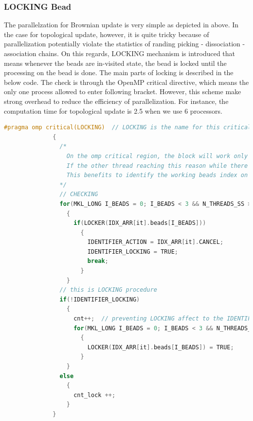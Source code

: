 \documentclass[10pt, a4paper]{article}
\begin{document}
\begin{appendices}
  \subsubsection{LOCKING Bead}
  The parallelzation for Brownian update is very simple as depicted in above. In the case for topological update, however, it is quite tricky because of parallelization potentially violate the statistics of randing picking - dissociation - association chains. On this regards, LOCKING mechanism is introduced that means whenever the beads are in-visited state, the bead is locked until the processing on the bead is done. The main parts of locking is described in the below code. The check is through the OpenMP critical directive, which means the only one process allowed to enter following bracket. However, this scheme make strong overhead to reduce the efficiency of parallelization. For instance, the computation time for topological update is 2.5 when we use 6 processors. 

  \begin{lstlisting}[language=C++,frame=single]
#pragma omp critical(LOCKING)  // LOCKING is the name for this critical blocks
              {
                /*
                  On the omp critical region, the block will work only one thread.
                  If the other thread reaching this reason while there is one thread already working on this block, then the reached thread will wait until finishing the job of the other thread.
                  This benefits to identify the working beads index on this case, since the 
                */
                // CHECKING
                for(MKL_LONG I_BEADS = 0; I_BEADS < 3 && N_THREADS_SS > 1; I_BEADS++)
                  {
                    if(LOCKER(IDX_ARR[it].beads[I_BEADS]))
                      {
                        IDENTIFIER_ACTION = IDX_ARR[it].CANCEL;
                        IDENTIFIER_LOCKING = TRUE;
                        break;
                      }
                  }
                // this is LOCKING procedure
                if(!IDENTIFIER_LOCKING)
                  {
                    cnt++;  // preventing LOCKING affect to the IDENTIFICATION of stochastic balance
                    for(MKL_LONG I_BEADS = 0; I_BEADS < 3 && N_THREADS_SS > 1; I_BEADS++)
                      {
                        LOCKER(IDX_ARR[it].beads[I_BEADS]) = TRUE;
                      }
                  }
                else
                  {
                    cnt_lock ++;
                  }
              }

  \end{lstlisting}

\end{appendices}
\end{document}

